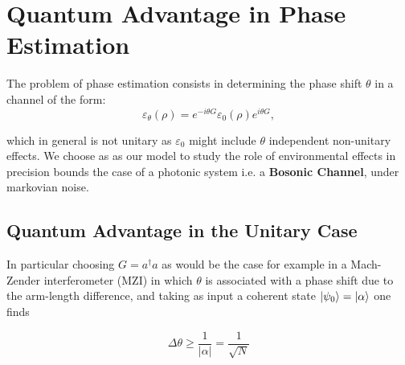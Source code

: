 \section{Quantum Advantage in Phase Estimation}
The problem of phase estimation consists in determining the phase shift $\theta$ in a channel of the form:
\begin{equation}
  \varepsilon_{\theta}(\rho) = e^{-i\theta G}\varepsilon_{0}(\rho)e^{i\theta G},
\end{equation}

which in general is not unitary as $\varepsilon_{0}$ might include $\theta$ independent non-unitary effects. We choose as
as our model to study the role of environmental effects in precision bounds the case of a photonic system i.e. a \textbf{Bosonic Channel},
under markovian noise.
\subsection{Quantum Advantage in the Unitary Case}
In particular choosing $G=a^{\dagger}a$ as would be the case for example in a Mach-Zender interferometer (MZI) in which $\theta$ is associated
with a phase shift due to the arm-length difference, and taking as input a coherent state $\ket{\psi_{0}}=\ket{\alpha}$ one finds

\begin{equation}
\Delta \theta \geq \frac{1}{|\alpha|}=\frac{1}{\sqrt{N}}
\end{equation}

